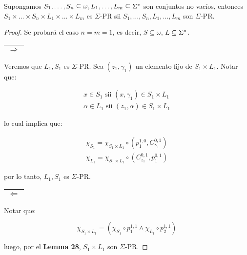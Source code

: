  \begin{lemma}
    \par Supongamos $S_{1}, \dotsc, S_{n} \subseteq \omega, L_{1}, \dotsc, L_{m} \subseteq \Sigma^{\ast}$ son conjuntos no
    vacíos, entonces $S_{1} \times \dotsc \times S_{n} \times L_{1} \times \dotsc \times L_{m}$ es $\Sigma$-PR sii
    $S_{1}, \dotsc, S_{n}, L_{1}, \dotsc, L_{m}$ son $\Sigma$-PR.
  \end{lemma}
  \begin{proof}
    \par Se probará el caso $n = m = 1$, es decir, $S \subseteq \omega$, $L \subseteq \Sigma^{\ast}$.

    \vspace{3mm}
    \begin{tabular}{|c|} \hline $\Rightarrow$ \\\hline \end{tabular} Veremos que $L_{1}, S_{1}$ es $\Sigma$-PR. Sea
    $(z_{1}, \gamma_{1})$ un elemento fijo de $S_{1} \times L_{1}$. Notar que:

    \begin{eqnarray}
      \nonumber x \in S_{1} \text{ sii } (x, \gamma_{1}) \in S_{1} \times L_{1} \\
      \nonumber \alpha \in L_{1} \text{ sii } (z_{1}, \alpha) \in S_{1} \times L_{1}
    \end{eqnarray}

    \par lo cual implica que:

    \begin{eqnarray}
      \nonumber \chi_{S_{1}} = \chi_{S_{1} \times L_{1}} \circ \left(p_{1}^{1,0}, C_{\gamma_{1}}^{0,1}\right) \\
      \nonumber \chi_{L_{1}} = \chi_{S_{1} \times L_{1}} \circ \left(C_{z_{1}}^{0,1}, p_{1}^{0,1}\right)
    \end{eqnarray}

    \par por lo tanto, $L_{1}, S_{1}$ es $\Sigma$-PR.

    \vspace{3mm}
    \begin{tabular}{|c|} \hline $\Leftarrow$\\\hline \end{tabular} Notar que:

    \[
      \chi_{S_{1} \times L_{1}} = \left(\chi_{S_{1}} \circ p_{1}^{1,1} \wedge \chi_{L_{1}} \circ p_{2}^{1,1} \right)
    \]

    \par luego, por el \textbf{Lemma 28}, $S_{1} \times L_{1}$ son $\Sigma$-PR.
  \end{proof}


